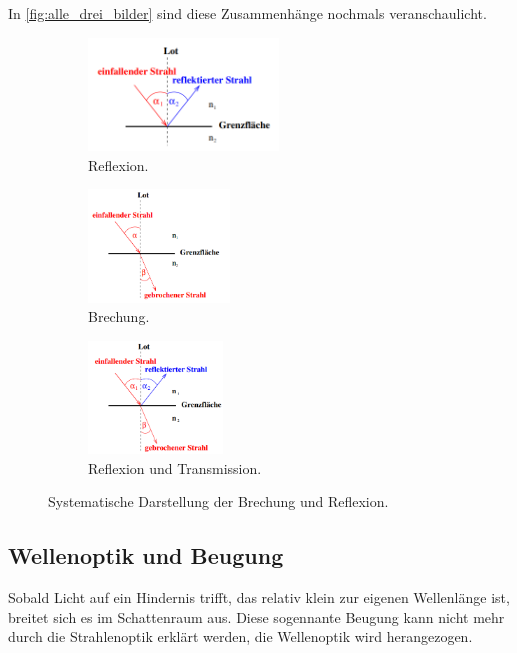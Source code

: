     
    \noindent
    In \autoref{fig:alle_drei_bilder} sind diese Zusammenhänge nochmals veranschaulicht.
    \begin{figure}[h]
        \begin{subfigure}[b]{.33\linewidth}
        \centering
        \includegraphics[height=3cm, keepaspectratio]{bilder/reflex.PNG}
        \caption{Reflexion.}\label{fig:reflex}
        \end{subfigure}%
        \begin{subfigure}[b]{.33\linewidth}
        \centering
        \includegraphics[height=3cm, keepaspectratio]{bilder/brech.PNG}
        \caption{Brechung.}\label{fig:brech}
        \end{subfigure}
        \begin{subfigure}[b]{.33\linewidth}
        \centering
        \includegraphics[height=3cm, keepaspectratio]{bilder/reflexUNDtrans.PNG}
        \caption{Reflexion und Transmission.}\label{fig:reflexUNDtrans}
        \end{subfigure}
        \caption{Systematische Darstellung der Brechung und Reflexion. \cite{anleitung}}
        \label{fig:alle_drei_bilder}
    \end{figure}


\subsection{Wellenoptik und Beugung}
\label{Beugung}
    Sobald Licht auf ein Hindernis trifft, das relativ klein zur eigenen Wellenlänge ist, breitet sich es im Schattenraum aus.
    Diese sogennante Beugung kann nicht mehr durch die Strahlenoptik erklärt werden, die Wellenoptik wird herangezogen.
    

